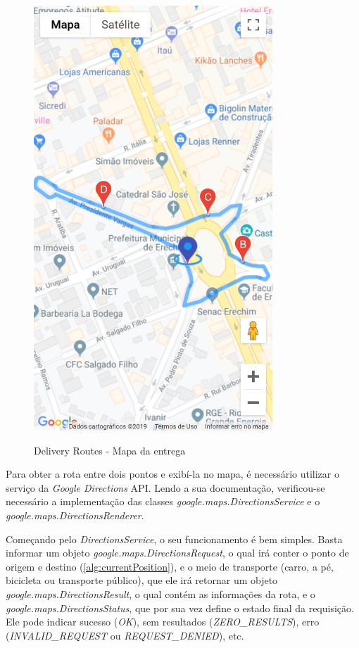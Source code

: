 \newpage
\begin{figure}[H]
    \centering
    \caption{Delivery Routes - Mapa da entrega}
    \includegraphics[width=0.8\textwidth]{./dados/figuras/fig27}
    \label{fig:drRotaEntrega}
\end{figure}

\newpage
Para obter a rota entre dois pontos e exibí-la no mapa, é necessário utilizar o serviço da \textit{Google Directions} API. Lendo a sua documentação, verificou-se necessário a implementação das classes \textit{google.maps.DirectionsService} e o \textit{google.maps.DirectionsRenderer}.

Começando pelo \textit{DirectionsService}, o seu funcionamento é bem simples. Basta informar um objeto \textit{google.maps.DirectionsRequest}, o qual irá conter o ponto de origem e destino (\autoref{alg:currentPosition}), e o meio de transporte (carro, a pé, bicicleta ou transporte público), que ele irá retornar um objeto \textit{google.maps.DirectionsResult}, o qual contém as informações da rota, e o \textit{google.maps.DirectionsStatus}, que por sua vez define o estado final da requisição. Ele pode indicar sucesso (\textit{OK}), sem resultados (\textit{ZERO\_RESULTS}), erro (\textit{INVALID\_REQUEST} ou \textit{REQUEST\_DENIED}), etc.

